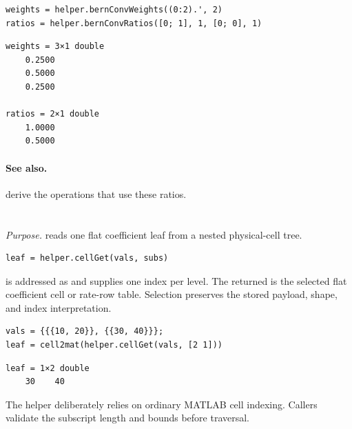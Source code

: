 \examplehead
\begin{lstlisting}[style=dpmatlab]
weights = helper.bernConvWeights((0:2).', 2)
ratios = helper.bernConvRatios([0; 1], 1, [0; 0], 1)
\end{lstlisting}
\begin{lstlisting}[style=dpoutput]
weights = 3×1 double
    0.2500
    0.5000
    0.2500

ratios = 2×1 double
    1.0000
    0.5000
\end{lstlisting}

\paragraph{See also.}  derive the operations that use these ratios.

\section{\texorpdfstring{}{helper.cellGet}}

\textit{Purpose.}  reads one flat coefficient leaf from a nested physical-cell tree.

\syntaxhead
\begin{lstlisting}[style=dpsyntax]
leaf = helper.cellGet(vals, subs)
\end{lstlisting}

\descriptionhead
{} is addressed as  and  supplies one index per level. The returned  is the selected flat coefficient cell or rate-row table. Selection preserves the stored payload, shape, and index interpretation.

\examplehead
\begin{lstlisting}[style=dpmatlab]
vals = {{{10, 20}}, {{30, 40}}};
leaf = cell2mat(helper.cellGet(vals, [2 1]))
\end{lstlisting}
\begin{lstlisting}[style=dpoutput]
leaf = 1×2 double
    30    40
\end{lstlisting}

\remarkshead
The helper deliberately relies on ordinary MATLAB cell indexing.  Callers validate the subscript length and bounds before traversal.

\section{\texorpdfstring{}{helper.chk}}

